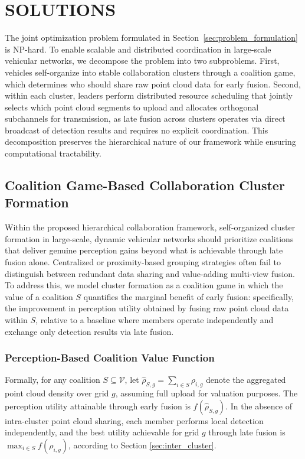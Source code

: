 \documentclass[conference]{IEEEtran}
\begin{document}
\section{SOLUTIONS}

The joint optimization problem formulated in Section~\ref{sec:problem_formulation} is NP-hard. To enable scalable and distributed coordination in large-scale vehicular networks, we decompose the problem into two subproblems. First, vehicles self-organize into stable collaboration clusters through a coalition game, which determines who should share raw point cloud data for early fusion. Second, within each cluster, leaders perform distributed resource scheduling that jointly selects which point cloud segments to upload and allocates orthogonal subchannels for transmission, as late fusion across clusters operates via direct broadcast of detection results and requires no explicit coordination. This decomposition preserves the hierarchical nature of our framework while ensuring computational tractability.

\subsection{Coalition Game-Based Collaboration Cluster Formation}

Within the proposed hierarchical collaboration framework, self-organized cluster formation in large-scale, dynamic vehicular networks should prioritize coalitions that deliver genuine perception gains beyond what is achievable through late fusion alone. Centralized or proximity-based grouping strategies often fail to distinguish between redundant data sharing and value-adding multi-view fusion. To address this, we model cluster formation as a coalition game in which the value of a coalition $S$ quantifies the marginal benefit of early fusion: specifically, the improvement in perception utility obtained by fusing raw point cloud data within $S$, relative to a baseline where members operate independently and exchange only detection results via late fusion.

\subsubsection{Perception-Based Coalition Value Function}

Formally, for any coalition $S \subseteq \mathcal{V}$, let $\hat{\rho}_{S,g} = \sum_{i \in S} \rho_{i,g}$ denote the aggregated point cloud density over grid $g$, assuming full upload for valuation purposes. The perception utility attainable through early fusion is $f(\hat{\rho}_{S,g})$. In the absence of intra-cluster point cloud sharing, each member performs local detection independently, and the best utility achievable for grid $g$ through late fusion is $\max_{i \in S} f(\rho_{i,g})$, 
according to Section \ref{sec:inter_cluster}.
\end{document}
